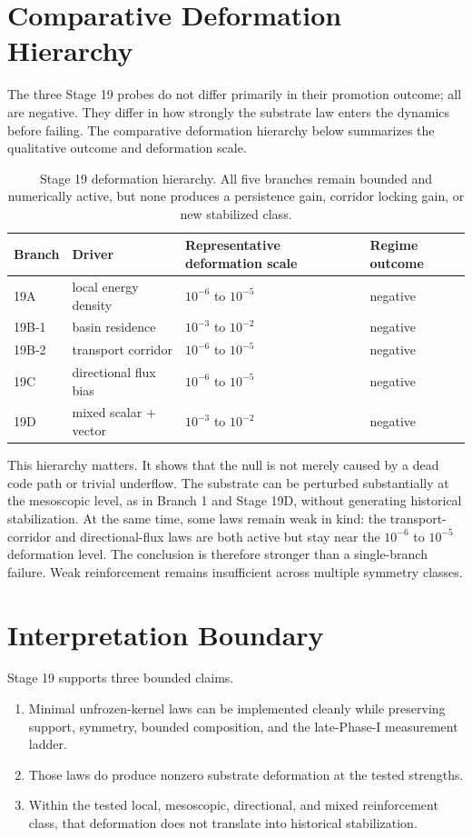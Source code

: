 \documentclass[11pt]{article}
\begin{document}
\section{Comparative Deformation Hierarchy}

The three Stage 19 probes do not differ primarily in their promotion outcome; all are negative. They differ in how strongly the substrate law enters the dynamics before failing. The comparative deformation hierarchy below summarizes the qualitative outcome and deformation scale.

\begin{table}[h]
\centering
\begin{tabular}{@{}llll@{}}
\toprule
Branch & Driver & Representative deformation scale & Regime outcome \\
\midrule
19A & local energy density & $10^{-6}$ to $10^{-5}$ & negative \\
19B-1 & basin residence & $10^{-3}$ to $10^{-2}$ & negative \\
19B-2 & transport corridor & $10^{-6}$ to $10^{-5}$ & negative \\
19C & directional flux bias & $10^{-6}$ to $10^{-5}$ & negative \\
19D & mixed scalar + vector & $10^{-3}$ to $10^{-2}$ & negative \\
\bottomrule
\end{tabular}
\caption{Stage 19 deformation hierarchy. All five branches remain bounded and numerically active, but none produces a persistence gain, corridor locking gain, or new stabilized class.}
\end{table}

This hierarchy matters. It shows that the null is not merely caused by a dead code path or trivial underflow. The substrate can be perturbed substantially at the mesoscopic level, as in Branch 1 and Stage 19D, without generating historical stabilization. At the same time, some laws remain weak in kind: the transport-corridor and directional-flux laws are both active but stay near the $10^{-6}$ to $10^{-5}$ deformation level. The conclusion is therefore stronger than a single-branch failure. Weak reinforcement remains insufficient across multiple symmetry classes.

\section{Interpretation Boundary}

Stage 19 supports three bounded claims.
\begin{enumerate}
\item Minimal unfrozen-kernel laws can be implemented cleanly while preserving support, symmetry, bounded composition, and the late-Phase-I measurement ladder.
\item Those laws do produce nonzero substrate deformation at the tested strengths.
\item Within the tested local, mesoscopic, directional, and mixed reinforcement class, that deformation does not translate into historical stabilization.
\end{enumerate}
\end{document}
